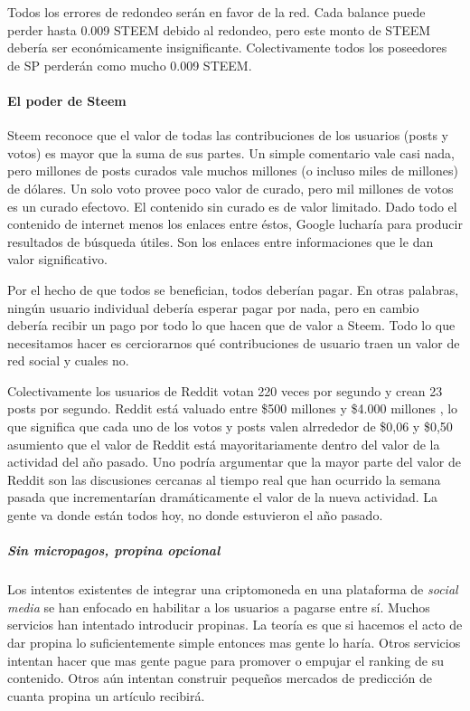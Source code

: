 \documentclass[a4paper,titlepage,final]{article}
\begin{document}
Todos los errores de redondeo serán en favor de la red. Cada balance puede perder hasta 0.009 STEEM debido al redondeo, pero este monto de STEEM debería ser económicamente insignificante. Colectivamente todos los poseedores de SP perderán como mucho 0.009 STEEM.

\paragraph{El poder de Steem}

Steem reconoce que el valor de todas las contribuciones de los usuarios (posts y votos) es mayor que la suma de sus partes. Un simple comentario vale casi nada, pero millones de posts curados vale muchos millones (o incluso miles de millones) de dólares. Un solo voto provee poco valor de curado, pero mil millones de votos es un curado efectovo. El contenido sin curado es de valor limitado. Dado todo el contenido de internet menos los enlaces entre éstos, Google lucharía para producir resultados de búsqueda útiles. Son los enlaces entre informaciones que le dan valor significativo.

Por el hecho de que todos se benefician, todos deberían pagar. En otras palabras, ningún usuario individual debería esperar pagar por nada, pero en cambio debería recibir un pago por todo lo que hacen que de valor a Steem. Todo lo que necesitamos hacer es cerciorarnos qué contribuciones de usuario traen un valor de red social y cuales no.

Colectivamente los usuarios de Reddit votan 220 veces por segundo y crean 23 posts por segundo. Reddit está valuado entre \$500 millones \cite{21} y \$4.000 millones \cite{22}, lo que significa que cada uno de los votos y posts valen alrrededor de \$0,06 y \$0,50 asumiento que el valor de Reddit está mayoritariamente dentro del valor de la actividad del año pasado. Uno podría argumentar que la mayor parte del valor de Reddit son las discusiones cercanas al tiempo real que han ocurrido la semana pasada que incrementarían dramáticamente el valor de la nueva actividad. La gente va donde están todos hoy, no donde estuvieron el año pasado.

\subparagraph{Sin micropagos, propina opcional}

Los intentos existentes de integrar una criptomoneda en una plataforma de \textit{social media} se han enfocado en habilitar a los usuarios a pagarse entre sí. Muchos servicios han intentado introducir propinas. La teoría es que si hacemos el acto de dar propina lo suficientemente simple entonces mas gente lo haría. Otros servicios intentan hacer que mas gente pague para promover o empujar el ranking de su contenido. Otros aún intentan construir pequeños mercados de predicción de cuanta propina un artículo recibirá.
\end{document}
